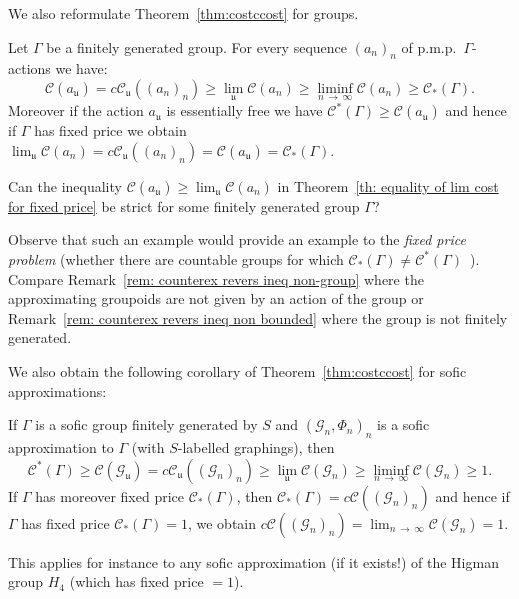 \documentclass[AHL,Unicode,longabstracts,published]{cedram}
\newcommand{\cost}{\mathcal{C}}
\newcommand{\ccost}{c\mathcal{C}}
\newcommand{\cg}{\mathcal{G}}
\newcommand{\vraicost}{\mathscr{C}}
\newcommand{\ul}{\mathfrak{u}}
\newcommand{\pmp}{p.m.p.\ }
\begin{document}
We also reformulate Theorem~\ref{thm:costccost} for groups.

\begin{theo}\label{th: equality of lim cost for fixed price}
Let $\Gamma$ be a finitely generated group. For every sequence $(a_n)_n$ of \pmp $\Gamma$-actions we have:
\begin{equation}\label{eq: ineqs an, bn}
\cost(a_\ul)=\ccost_\ul((a_n)_n) \geq \lim_{\ul}\cost(a_{n})\geq \liminf_{n\,\to\,\infty}\cost(a_{n}) \geq \vraicost_*(\Gamma).
\end{equation}
Moreover if the action $a_\ul$ is essentially free we have $\vraicost^*(\Gamma)\geq \cost(a_\ul)$ and hence if $\Gamma$ has fixed price we obtain $\lim_\ul\cost(a_n)=\ccost_\ul((a_n)_n)=\cost(a_{\ul})=\vraicost_*(\Gamma)$.
\end{theo}

\begin{ques}\label{qst:cont}
Can the inequality $\cost(a_\ul)\geq\lim_\ul\cost(a_n)$ in Theorem~\ref{th: equality of lim cost for fixed price} be strict for some finitely generated group $\Gamma$?
\end{ques} Observe that such an example would provide an example to the {\em fixed price problem} (whether there are countable groups for which $\vraicost_*(\Gamma)\not=\vraicost^*(\Gamma)$~\cite[Question~I.8]{Gab-cost}). Compare Remark~\ref{rem: counterex revers ineq non-group} where the approximating groupoids are not given by an action of the group or Remark~\ref{rem: counterex revers ineq non bounded} where the group is not finitely generated.


We also obtain the following corollary of Theorem~\ref{thm:costccost} for sofic approximations:
\begin{coro}\label{cor: sofic gp - sofic approx - comb cost}
If $\Gamma$ is a sofic group finitely generated by $S$ and $(\cg_n, \Phi_n)_n$ is a sofic approximation to $\Gamma$ (with $S$-labelled graphings), then
\begin{equation}
\vraicost^*(\Gamma)\geq \cost(\cg_\ul)=\ccost_\ul((\cg_n)_n) \geq \lim_{\ul}\cost(\cg_{n})\geq \liminf_{n\,\to\,\infty}\cost(\cg_{n}) \geq 1.
\end{equation}
If $\Gamma$ has moreover fixed price $\vraicost_*(\Gamma)$, then $\vraicost_*(\Gamma)=\ccost((\cg_n)_n) $ and hence if $\Gamma$ has fixed price $\vraicost_*(\Gamma)=1$, we obtain $\ccost((\cg_n)_n) = \lim_{n\,\to\,\infty}\cost(\cg_{n}) = 1$.
\end{coro}

This applies for instance to any sofic approximation (if it exists!) of the Higman group $H_4$ (which has fixed price $=1$).
\end{document}
